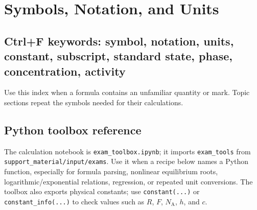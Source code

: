 \section{Symbols, Notation, and Units}

\subsection{Ctrl+F keywords: symbol, notation, units, constant, subscript, standard state, phase, concentration, activity}
Use this index when a formula contains an unfamiliar quantity or mark. Topic sections repeat the symbols needed for their calculations.

\subsection{Python toolbox reference}
The calculation notebook is \texttt{exam\_toolbox.ipynb}; it imports \texttt{exam\_tools} from \texttt{support\_material/input/exams}. Use it when a recipe below names a Python function, especially for formula parsing, nonlinear equilibrium roots, logarithmic/exponential relations, regression, or repeated unit conversions. The toolbox also exports physical constants; use \texttt{constant(...)} or \texttt{constant\_info(...)} to check values such as \(R\), \(F\), \(N_{\mathrm A}\), \(h\), and \(c\).

